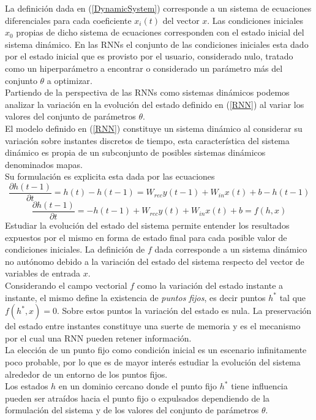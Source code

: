 \documentclass{article}
\begin{document}
	La definición dada en (\ref{DynamicSystem}) corresponde a un sistema de ecuaciones diferenciales para cada coeficiente $x_i(t)$ del vector $x$. Las condiciones iniciales $x_0$ propias de dicho sistema de ecuaciones corresponden con el estado inicial del sistema dinámico. En las RNNs el conjunto de las condiciones iniciales esta dado por el estado inicial que es provisto por el usuario, considerado nulo, tratado como un hiperparámetro a encontrar o considerado un parámetro más del conjunto $\theta$ a optimizar\cite{22IntroBackpropagation}.\\
	Partiendo de la perspectiva de las RNNs como sistemas dinámicos podemos analizar la variación en la evolución del estado definido en (\ref{RNN}) al variar los valores del conjunto de parámetros $\theta$.\\
	El modelo definido en (\ref{RNN}) constituye un sistema dinámico al considerar su variación sobre instantes discretos de tiempo\cite{10Pascanu}, esta característica del sistema dinámico es propia de un subconjunto de posibles sistemas dinámicos denominados mapas.\\
	Su formulación es explicita esta dada por las ecuaciones
	\begin{equation*}
	\dfrac{\partial h(t-1)}{\partial t} = h(t) - h(t-1) =  W_{rec} y(t-1) + W_{in} x(t) + b - h(t-1)
	\end{equation*}
	\begin{equation}\label{RNNdynamics}
	\dfrac{\partial h(t-1)}{\partial t} = - h(t-1) + W_{rec}y(t) + W_{in} x(t) + b = f(h, x)
	\end{equation}
	Estudiar la evolución del estado del sistema permite entender los resultados expuestos por el mismo en forma de estado final para cada posible valor de condiciones iniciales. La definición de $f$ dada corresponde a un sistema dinámico no autónomo debido a la variación del estado del sistema respecto del vector de variables de entrada $x$.\\
	
	Considerando el campo vectorial $f$ como la variación del estado instante a instante, el mismo define la existencia de \textit{puntos fijos}, es decir puntos $h^*$ tal que $f(h^*, x) = 0$. Sobre estos puntos la variación del estado es nula. La preservación del estado entre instantes constituye una suerte de memoria y es el mecanismo por el cual una RNN pueden retener información.\\
	
	La elección de un punto fijo como condición inicial es un escenario infinitamente poco probable, por lo que es de mayor interés estudiar la evolución del sistema alrededor de un entorno de los puntos fijos. \\
	Los estados $h$ en un dominio cercano donde el punto fijo $h^*$ tiene influencia pueden ser atraídos hacia el punto fijo o expulsados dependiendo de la formulación del sistema y de los valores del conjunto de parámetros $\theta$. \\
	
\end{document}
